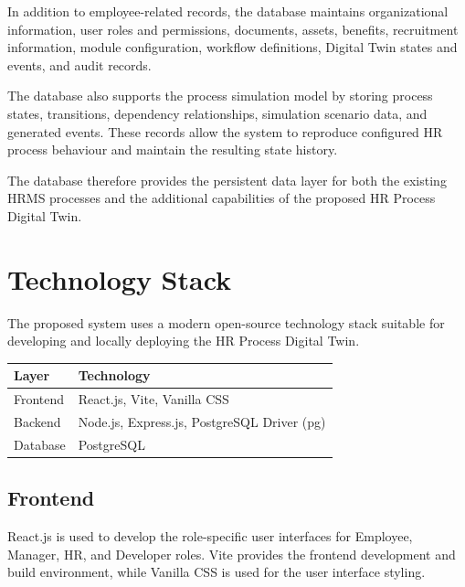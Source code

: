\documentclass[12pt,a4paper]{article}
\begin{document}
In addition to employee-related records, the database maintains
organizational information, user roles and permissions, documents,
assets, benefits, recruitment information, module configuration,
workflow definitions, Digital Twin states and events, and audit
records.

The database also supports the process simulation model by storing
process states, transitions, dependency relationships, simulation
scenario data, and generated events. These records allow the system
to reproduce configured HR process behaviour and maintain the
resulting state history.

The database therefore provides the persistent data layer for both
the existing HRMS processes and the additional capabilities of the
proposed HR Process Digital Twin.


\section{Technology Stack}

The proposed system uses a modern open-source technology stack
suitable for developing and locally deploying the HR Process Digital
Twin.

\begin{center}
\begin{longtable}{@{}p{4cm}p{8.5cm}@{}}
\toprule
\textbf{Layer} & \textbf{Technology} \\
\midrule

Frontend &
React.js, Vite, Vanilla CSS \\

Backend &
Node.js, Express.js, PostgreSQL Driver (pg) \\

Database &
PostgreSQL \\

\bottomrule
\end{longtable}
\end{center}

\subsection{Frontend}

React.js is used to develop the role-specific user
interfaces for Employee, Manager, HR, and Developer roles. Vite
provides the frontend development and build environment, while
Vanilla CSS is used for the user interface styling.
\end{document}
